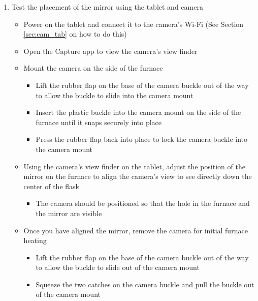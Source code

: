 \documentclass[letterpaper,11pt]{article}
\begin{document}
\begin{enumerate}
    \item Test the placement of the mirror using the tablet and camera %
        \begin{itemize}
        \item Power on the tablet and connect it to the camera's Wi-Fi (See 
            Section \ref{sec:cam_tab} on how to do this)
        \item Open the Capture app to view the camera's view finder
        \item Mount the camera on the side of the furnace 
            \begin{itemize}
            \item Lift the rubber flap on the base of the camera buckle 
                out of the way to allow the buckle to slide into the camera 
                mount 
            \item Insert the plastic buckle into the camera mount on the side 
                of the furnace until it snaps securely into place
            \item Press the rubber flap back into place to lock the camera 
                buckle into the camera mount 
            \end{itemize}
        \item Using the camera's view finder on the tablet, adjust the
            position of the mirror on the furnace to align the camera's view to 
            see directly down the center of the flask
            \begin{itemize}
            \item The camera should be positioned so that the hole in the 
                furnace and the mirror are visible 
            \end{itemize}
        \item Once you have aligned the mirror, remove the camera for initial
            furnace heating
            \begin{itemize}
            \item Lift the rubber flap on the base of the camera buckle 
                out of the way to allow the buckle to slide out of the camera 
                mount
            \item Squeeze the two catches on the camera buckle and pull the 
                buckle out of the camera mount
            \end{itemize}
        \end{itemize}
    

\end{enumerate}
\end{document}
